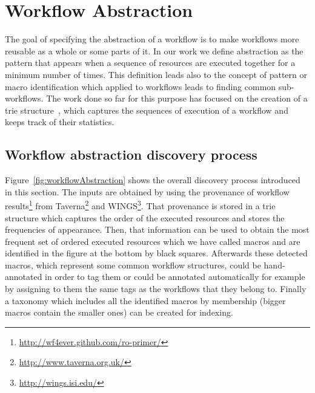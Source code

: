 \section{Workflow Abstraction}

\label{sec:abstraction}


The goal of specifying the abstraction of a workflow is to make workflows more reusable as a whole or some parts of it. In our work we define abstraction as the pattern that appears when a sequence of resources are executed together for a minimum number of times. This definition leads also to the concept of pattern or macro identification which applied to workflows leads to finding common sub-workflows. The work done so far for this purpose has focused on the creation of a trie structure~\cite{knuth11}, which captures the sequences of execution of a workflow and keeps track of their statistics. 


\subsection{Workflow abstraction discovery process}
Figure~\ref{fig:workflowAbstraction} shows the overall discovery process introduced in this section. The inputs are obtained by using the provenance of workflow results\footnote{\url{http://wf4ever.github.com/ro-primer/}} from Taverna\footnote{\url{http://www.taverna.org.uk/}} and WINGS\footnote{\url{http://wings.isi.edu/}}. That provenance is stored in a trie structure which captures the order of the executed resources and stores the frequencies of appearance. Then, that information can be used to obtain the most frequent set of ordered executed resources which we have called macros and are identified in the figure at the bottom by black squares. Afterwards these detected macros, which represent some common workflow structures, could be hand-annotated in order to tag them or could be annotated automatically for example by assigning to them the same tags as the workflows that they belong to. Finally a taxonomy which includes all the identified macros by membership (bigger macros contain the smaller ones) can be created for indexing.

